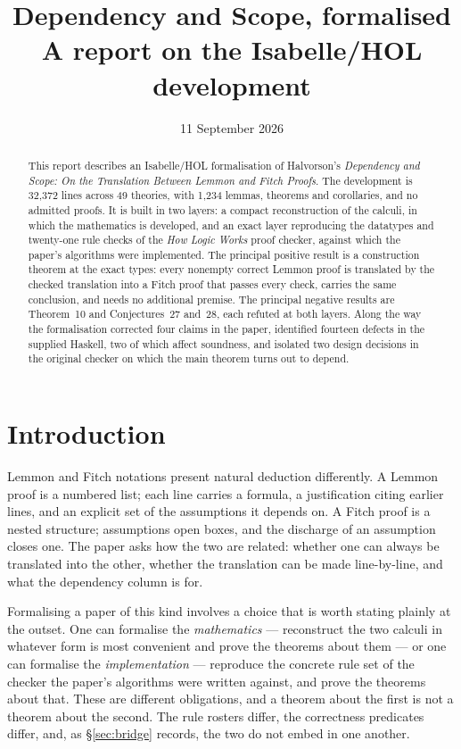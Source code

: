 \documentclass[11pt]{article}
\title{Dependency and Scope, formalised\\
  \large A report on the Isabelle/HOL development}
\author{}
\date{11 September 2026}
\theoremstyle{plain}
\begin{document}
\maketitle

\begin{abstract}
\noindent
This report describes an Isabelle/HOL formalisation of Halvorson's
\emph{Dependency and Scope: On the Translation Between Lemmon and Fitch
Proofs}. The development is 32{,}372 lines across 49 theories, with
1{,}234 lemmas, theorems and corollaries, and no admitted proofs. It is built
in two layers: a compact reconstruction of the calculi, in which the
mathematics is developed, and an exact layer reproducing the datatypes and
twenty-one rule checks of the \emph{How Logic Works} proof checker, against
which the paper's algorithms were implemented. The principal positive result is
a construction theorem at the exact types: every nonempty correct Lemmon proof
is translated by the checked translation into a Fitch proof that passes every
check, carries the same conclusion, and needs no additional premise. The
principal negative results are Theorem~10 and Conjectures~27 and~28, each
refuted at both layers. Along the way the formalisation corrected four claims
in the paper, identified fourteen defects in the supplied Haskell, two of which
affect soundness, and isolated two design decisions in the original checker
on which the main theorem turns out to depend.
\end{abstract}

\tableofcontents

\section{Introduction}

Lemmon and Fitch notations present natural deduction differently. A Lemmon
proof is a numbered list; each line carries a formula, a justification citing
earlier lines, and an explicit set of the assumptions it depends on. A Fitch
proof is a nested structure; assumptions open boxes, and the discharge of an
assumption closes one. The paper asks how the two are related: whether one can
always be translated into the other, whether the translation can be made
line-by-line, and what the dependency column is for.

Formalising a paper of this kind involves a choice that is worth stating
plainly at the outset. One can formalise the \emph{mathematics} --- reconstruct
the two calculi in whatever form is most convenient and prove the theorems
about them --- or one can formalise the \emph{implementation} --- reproduce the
concrete rule set of the checker the paper's algorithms were written against,
and prove the theorems about that. These are different obligations, and a
theorem about the first is not a theorem about the second. The rule rosters
differ, the correctness predicates differ, and, as \S\ref{sec:bridge} records,
the two do not embed in one another.
\end{document}
